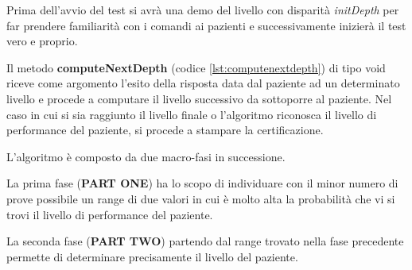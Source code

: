 \documentclass[
	corpo=12pt,
	twoside,
 	evenboxes,
	tipotesi=triennale,
    	stile=classica,
   	 greek,
]{toptesi}
\begin{document}
Prima dell'avvio del test si avrà una demo del livello con disparità \textit{initDepth} per far prendere familiarità con i comandi ai pazienti e successivamente inizierà il test vero e proprio.

Il metodo \textbf{computeNextDepth} (codice \ref{lst:computenextdepth}) di tipo void riceve come argomento l'esito della risposta data dal paziente ad un determinato livello e procede a computare il livello successivo da sottoporre al paziente. Nel caso in cui si sia raggiunto il livello finale o l'algoritmo riconosca il livello di performance del paziente, si procede a stampare la certificazione.

L’algoritmo è composto da due macro-fasi in successione. 

La prima fase (\textbf{PART ONE}) ha lo scopo di individuare con il minor numero di prove possibile un range di due valori in cui è molto alta la probabilità che vi si trovi il livello di performance del paziente. 

La seconda fase (\textbf{PART TWO}) partendo dal range trovato nella fase precedente permette di determinare precisamente il livello del paziente.

\newpage
\end{document}
